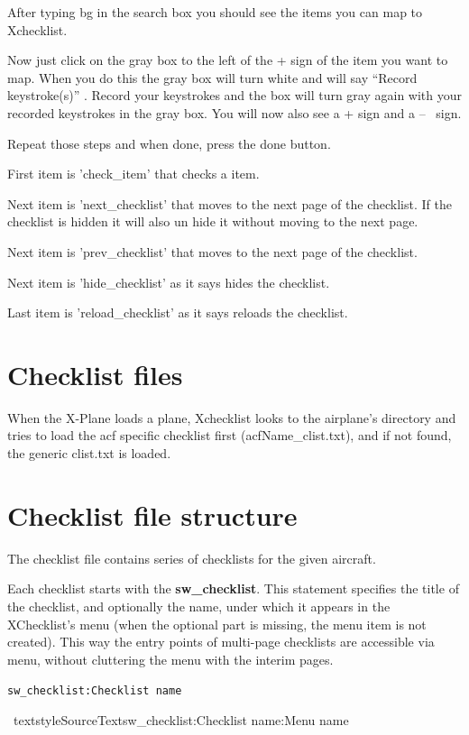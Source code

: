 \documentclass[11pt,parskip=half,a4paper]{scrartcl}
\newcommand\textstyleStrongEmphasis[1]{\textbf{#1}}
\newcommand\textstyleSourceText[1]{\texttt{#1}}
\begin{document}
After typing bg in the search box you should see the items you can map to Xchecklist.

Now just click on the gray box to the left of the + sign of the item you want to map. When you do this the gray box will turn white and will say ``Record keystroke(s)'' . Record your keystrokes and the box will turn gray again with your recorded keystrokes in the gray box. You will now also see a + sign and a -- \ sign.

Repeat those steps and when done, press the done button. 

First item is 'check\_item' that checks a item. 

Next item is 'next\_checklist' that moves to the next page of the checklist. If the checklist is hidden it 
will also un hide it without moving to the next page. 

Next item is 'prev\_checklist' that moves to the next page of the checklist.

Next item is 'hide\_checklist' as it says hides the checklist.

Last item is 'reload\_checklist' as it says reloads the checklist.

\newpage
\section{Checklist files}

When the X-Plane loads a plane, Xchecklist looks to the airplane's directory and tries to load the acf specific
checklist first (acfName\_clist.txt), and if not found, the generic clist.txt is loaded.


\section{Checklist file structure}

The checklist file contains series of checklists for the given aircraft.

Each checklist starts with the \textstyleStrongEmphasis{sw\_checklist}. This statement specifies the title of the checklist, and optionally the name, under which it appears in the XChecklist's menu (when the optional part is missing, the menu item is not created). This way the {\textquotedbl}entry points{\textquotedbl} of multi-page checklists are accessible via menu, without cluttering the menu with the interim pages.

\textstyleSourceText{sw\_checklist:Checklist name}

\ textstyleSourceText{sw\_checklist:Checklist name:Menu name}
\end{document}
